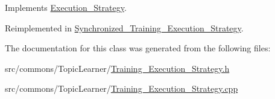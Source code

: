 Implements \hyperlink{class_execution___strategy_a62fc15af296f2f27f44848eb56aa3ff9}{Execution\_\-Strategy}.



Reimplemented in \hyperlink{class_synchronized___training___execution___strategy_a77e2fa3f19b544fa4392c9ed56c504e4}{Synchronized\_\-Training\_\-Execution\_\-Strategy}.



The documentation for this class was generated from the following files:\begin{DoxyCompactItemize}
\item 
src/commons/TopicLearner/\hyperlink{_training___execution___strategy_8h}{Training\_\-Execution\_\-Strategy.h}\item 
src/commons/TopicLearner/\hyperlink{_training___execution___strategy_8cpp}{Training\_\-Execution\_\-Strategy.cpp}\end{DoxyCompactItemize}
